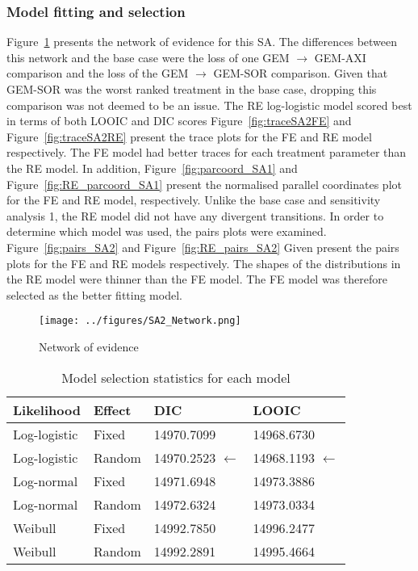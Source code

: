 \subsubsection{Model fitting and selection}
Figure~\ref{fig:sa2net} presents the network of evidence for this SA. The differences between this network and the base case were the loss of one GEM $\rightarrow$ GEM-AXI comparison and the loss of the GEM $\rightarrow$ GEM-SOR comparison. Given that GEM-SOR was the worst ranked treatment in the base case, dropping this comparison was not deemed to be an issue. The RE log-logistic model scored best in terms of both LOOIC and DIC scores Figure~\ref{fig:traceSA2FE} and Figure~\ref{fig:traceSA2RE} present the trace plots for the FE and RE model respectively. The FE model had better traces for each treatment parameter than the RE model. In addition, Figure~\ref{fig:parcoord_SA1} and Figure~\ref{fig:RE_parcoord_SA1} present the normalised parallel coordinates plot for the FE and RE model, respectively. Unlike the base case and sensitivity analysis 1, the RE model did not have any divergent transitions. In order to determine which model was used, the pairs plots were examined. Figure~\ref{fig:pairs_SA2} and Figure~\ref{fig:RE_pairs_SA2} Given present the pairs plots for the FE and RE models respectively. The shapes of the distributions in the RE model were thinner than the FE model. The FE model was therefore selected as the better fitting model. \\

\begin{figure}[h]
    \centering
    \texttt{[image: ../figures/SA2\_Network.png]}
    \caption{Network of evidence}
    \label{fig:sa2net}
\end{figure}

\begin{table}[h]
    \centering
    \begin{tabular}{llll}
    \hline
    Likelihood   & Effect & DIC        & LOOIC      \\ \hline
    Log-logistic & Fixed  & 14970.7099 & 14968.6730 \\
    Log-logistic & Random & 14970.2523 $\leftarrow$ & 14968.1193 $\leftarrow$ \\
    Log-normal   & Fixed  & 14971.6948 & 14973.3886 \\
    Log-normal   & Random & 14972.6324 & 14973.0334 \\
    Weibull      & Fixed  & 14992.7850 & 14996.2477 \\
    Weibull      & Random & 14992.2891 & 14995.4664 \\ \hline
    \end{tabular}
    \caption{Model selection statistics for each model}
    \label{selectStatSA2}
\end{table}

